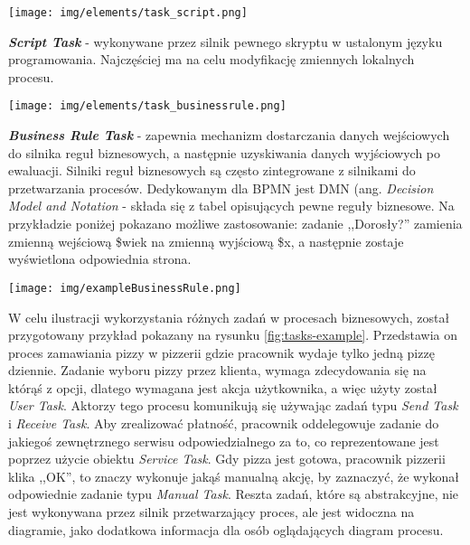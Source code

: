 \documentclass[declaration,shortabstract,mgr]{iithesis}
\newcommand{\bpmn}{BPMN }
\begin{document}
\vspace{\mypointsep}

\noindent\begin{minipage}[t]{0.1\textwidth}\vspace{0pt}
\texttt{[image: img/elements/task\_script.png]}
\end{minipage}\hfill
\begin{minipage}[t]{0.85\textwidth}\vspace{0pt}
\textbf{\textit{Script Task}} - wykonywane przez silnik pewnego skryptu w ustalonym języku programowania. Najczęściej ma na celu modyfikację zmiennych lokalnych procesu.
\end{minipage}

\vspace{\mypointsep}

\noindent\begin{minipage}[t]{0.1\textwidth}\vspace{0pt}
\texttt{[image: img/elements/task\_businessrule.png]}
\end{minipage}\hfill
\begin{minipage}[t]{0.85\textwidth}\vspace{0pt}
\textbf{\textit{Business Rule Task}} - zapewnia mechanizm dostarczania danych wejściowych do silnika reguł biznesowych, a następnie uzyskiwania danych wyjściowych po ewaluacji. Silniki reguł biznesowych są często zintegrowane z silnikami do przetwarzania procesów. Dedykowanym dla \bpmn jest DMN (ang. \textit{Decision Model and Notation} - składa się z tabel opisujących pewne reguły biznesowe. Na przykładzie poniżej pokazano możliwe zastosowanie: zadanie ,,Dorosły?'' zamienia zmienną wejściową \$wiek na zmienną wyjściową \$x, a następnie zostaje wyświetlona odpowiednia strona.
\begin{center}
\texttt{[image: img/exampleBusinessRule.png]}
\end{center}
\end{minipage}

\vspace{\mypointsep}

W celu ilustracji wykorzystania różnych zadań w procesach biznesowych, został przygotowany przykład pokazany na rysunku \ref{fig:tasks-example}. Przedstawia on proces zamawiania pizzy w pizzerii gdzie pracownik wydaje tylko jedną pizzę dziennie. Zadanie wyboru pizzy przez klienta, wymaga zdecydowania się na którąś z opcji, dlatego wymagana jest akcja użytkownika, a więc użyty został \textit{User Task}. Aktorzy tego procesu komunikują się używając zadań typu \textit{Send Task} i \textit{Receive Task}. Aby zrealizować płatność, pracownik oddelegowuje zadanie do jakiegoś zewnętrznego serwisu odpowiedzialnego za to, co reprezentowane jest poprzez użycie obiektu \textit{Service Task}. Gdy pizza jest gotowa, pracownik pizzerii klika ,,OK'', to znaczy wykonuje jakąś manualną akcję, by zaznaczyć, że wykonał odpowiednie zadanie typu \textit{Manual Task}. Reszta zadań, które są abstrakcyjne, nie jest wykonywana przez silnik przetwarzający proces, ale jest widoczna na diagramie, jako dodatkowa informacja dla osób oglądających diagram procesu.
\end{document}
